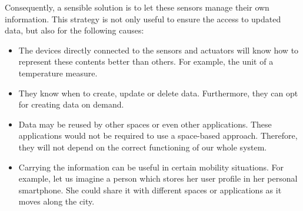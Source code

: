 Consequently, a sensible solution is to let these sensors manage their own information.
This strategy is not only useful to ensure the access to updated data, but also for the following causes: %
\begin{itemize}
  \item The devices directly connected to the sensors and actuators will know how to represent these contents better than others. %
	For example, the unit of a temperature measure.
  \item They know when to create, update or delete data. %
        Furthermore, they can opt for creating data on demand.
  \item Data may be reused by other spaces or even other applications. %
        These applications would not be required to use a space-based approach.
        Therefore, they will not depend on the correct functioning of our whole system. %
  \item Carrying the information can be useful in certain mobility situations.
        For example, let us imagine a person which stores her user profile in her personal smartphone.
        She could share it with different spaces or applications as it moves along the city.
\end{itemize}


